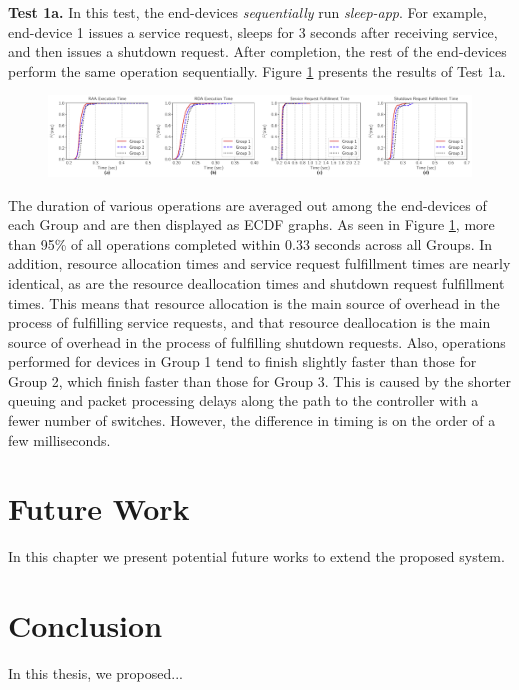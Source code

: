 \textbf{Test 1a.} In this test, the end-devices \textit{sequentially} run \textit{sleep-app}.
For example, end-device 1 issues a service request, sleeps for 3 seconds after receiving service, and then issues a shutdown request. 
After completion, the rest of the end-devices perform the same operation sequentially.
Figure \ref{test1a} presents the results of Test 1a.
%
%
\begin{figure}[t]
\centering
\includegraphics[width=1\linewidth]{test1.pdf}
  \label{test1a}
\end{figure}
%
%
The duration of various operations are averaged out among the end-devices of each Group and are then displayed as ECDF graphs.
As seen in Figure \ref{test1a}, more than 95\% of all operations completed within 0.33 seconds across all Groups.
In addition, resource allocation times and service request fulfillment times are nearly identical, as are the resource deallocation times and shutdown request fulfillment times.
This means that resource allocation is the main source of overhead in the process of fulfilling service requests, and that resource deallocation is the main source of overhead in the process of fulfilling shutdown requests.
Also, operations performed for devices in Group 1 tend to finish slightly faster than those for Group 2, which finish faster than those for Group 3.
This is caused by the shorter queuing and packet processing delays along the path to the controller with a fewer number of switches.
However, the difference in timing is on the order of a few milliseconds.






\chapter{Future Work}
\label{FutureWork}


In this chapter we present potential future works to extend the proposed system.




\chapter{Conclusion}
\label{Conclusion}

In this thesis, we proposed...
